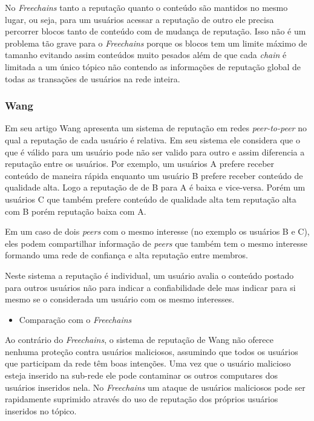 \documentclass[12pt]{article}
\newcommand{\FC} {\textit{Freechains}\xspace}
\newcommand{\PtoP} {\textit{peer-to-peer}\xspace}
\begin{document}
No \FC tanto a reputação quanto o conteúdo são mantidos no mesmo lugar, ou seja, para um usuários acessar a reputação de outro ele precisa percorrer blocos tanto de conteúdo com de mudança de reputação.
Isso não é um problema tão grave para o \FC porque os blocos tem um limite máximo de tamanho evitando assim conteúdos muito pesados além de que cada \textit{chain} é limitada a um único tópico não contendo as informações de reputação global de todas as transações de usuários na rede inteira.

\subsubsection{Wang} \label{subsub:wang}

Em seu artigo Wang apresenta um sistema de reputação em redes \PtoP no qual a reputação de cada usuário é relativa.
Em seu sistema ele considera que o que é válido para um usuário pode não ser valido para outro e assim diferencia a reputação entre os usuários. 
Por exemplo, um usuários A prefere receber conteúdo de maneira rápida enquanto um usuário B prefere receber conteúdo de qualidade alta. 
Logo a reputação de de B para A é baixa e vice-versa.
Porém um usuários C que também prefere conteúdo de qualidade alta tem reputação alta com B porém reputação baixa com A.

Em um caso de dois \textit{peers} com o mesmo interesse (no exemplo os usuários B e C), eles podem compartilhar informação de \textit{peers} que também tem o mesmo interesse formando uma rede de confiança e alta reputação entre membros.

Neste sistema a reputação é individual, um usuário avalia o conteúdo postado para outros usuários não para indicar a confiabilidade dele mas indicar para si mesmo se o considerada um usuário com os mesmo interesses.

\begin{itemize}
    \item Comparação com o \FC
\end{itemize}

Ao contrário do \FC, o sistema de reputação de Wang não oferece nenhuma proteção contra usuários maliciosos, assumindo que todos os usuários que participam da rede têm boas intenções.
Uma vez que o usuário malicioso esteja inserido na sub-rede ele pode contaminar os outros computares dos usuários inseridos nela.
No \FC um ataque de usuários maliciosos pode ser rapidamente suprimido através do uso de reputação dos próprios usuários inseridos no tópico.
\end{document}

